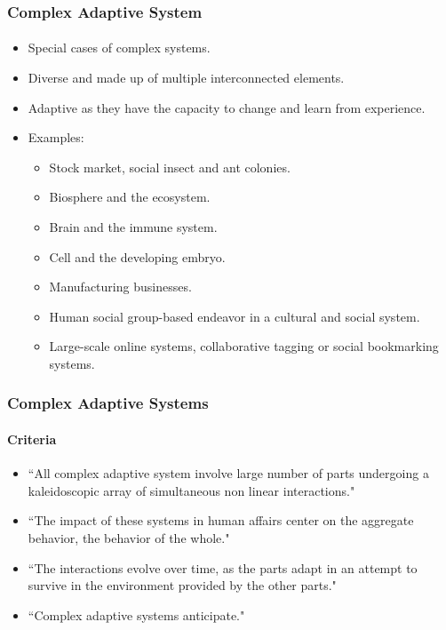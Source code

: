 \frame
{
	\frametitle{Complex Adaptive System}
	\framesubtitle{}

	\begin{itemize}
		\item Special cases of complex systems.
		\item Diverse and made up of multiple interconnected elements.
		\item Adaptive as they have the capacity to change and learn from experience.
		\item Examples:
		\begin{itemize}
			\item Stock market, social insect and ant colonies.
			\item Biosphere and the ecosystem.
			\item Brain and the immune system.
			\item Cell and the developing embryo.
			\item Manufacturing businesses.
			\item Human social group-based endeavor in a cultural and social system.
			\item Large-scale online systems, collaborative tagging or social bookmarking systems.
		\end{itemize}
	\end{itemize}
}

\frame
{
	\frametitle{Complex Adaptive Systems}
	\framesubtitle{Criteria}

	\begin{itemize}
		\item ``All complex adaptive system involve large number of parts undergoing a kaleidoscopic
array of simultaneous non linear interactions."
		\item ``The impact of these systems in human affairs center on the aggregate behavior, the
behavior of the whole."
		\item ``The interactions evolve over time, as the parts adapt in an attempt to survive in the
environment provided by the other parts."
		\item ``Complex adaptive systems anticipate."
	\end{itemize}
}


